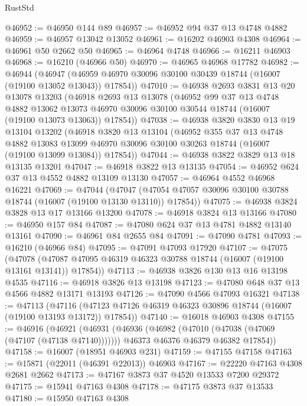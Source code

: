 \begin{lexlean}{RustStd}
\begin{coremodule}
@46952 := @46950 @144 @89
@46957 := @46952 @94 @37 @13 @4748 @4882
@46959 := @46957 @13042 @13052
@46961 := @16202 @46903 @4308
@46964 := @46961 @50 @2662 @50
@46965 := @46964 @4748
@46966 := @16211 @46903
@46968 := @16210 (@46966 @50)
@46970 := @46965 @46968 @17782
@46982 := @46944
    (@46947 (@46959 @46970 @30096 @30100 @30439 @18744 (@16007 (@19100 @13052 @13043)) @17854))
@47010 := @46938
    @2693
    @3831
    @13
    @20
    @13078
    @13203
    (@46918
      @2693
      @13
      @13078
      (@46952
        @99
        @37
        @13
        @4748
        @4882
        @13062
        @13073
        @46970
        @30096
        @30100
        @30544
        @18744
        (@16007 (@19100 @13073 @13063))
        @17854))
@47038 := @46938
    @3820
    @3830
    @13
    @19
    @13104
    @13202
    (@46918
      @3820
      @13
      @13104
      (@46952
        @355
        @37
        @13
        @4748
        @4882
        @13083
        @13099
        @46970
        @30096
        @30100
        @30263
        @18744
        (@16007 (@19100 @13099 @13084))
        @17854))
@47044 := @46938 @3822 @3829 @13 @18 @13135 @13201
@47047 := @46918 @3822 @13 @13135
@47054 := @46952 @624 @37 @13 @4552 @4882 @13109 @13130
@47057 := @46964 @4552 @46968 @16221
@47069 := @47044
    (@47047 (@47054 @47057 @30096 @30100 @30788 @18744 (@16007 (@19100 @13130 @13110)) @17854))
@47075 := @46938 @3824 @3828 @13 @17 @13166 @13200
@47078 := @46918 @3824 @13 @13166
@47080 := @46950 @157 @84
@47087 := @47080 @624 @37 @13 @4781 @4882 @13140 @13161
@47090 := @46961 @84 @2655 @84
@47091 := @47090 @4781
@47093 := @16210 (@46966 @84)
@47095 := @47091 @47093 @17920
@47107 := @47075
    (@47078 (@47087 @47095 @46319 @46323 @30788 @18744 (@16007 (@19100 @13161 @13141)) @17854))
@47113 := @46938 @3826 @130 @13 @16 @13198 @4535
@47116 := @46918 @3826 @13 @13198
@47123 := @47080 @648 @37 @13 @4566 @4882 @13171 @13193
@47126 := @47090 @4566 @47093 @16321
@47138 := @47113
    (@47116 (@47123 @47126 @46319 @46323 @30896 @18744 (@16007 (@19100 @13193 @13172)) @17854))
@47140 := @16018 @46903 @4308
@47155 := @46916
    (@46921
      (@46931
        (@46936 (@46982 (@47010 (@47038 (@47069 (@47107 (@47138 @47140)))))))
        @46373
        @46376
        @46379
        @46382
        @17854))
@47158 := @16007 (@18951 @46903 @231)
@47159 := @47155 @47158
@47163 := @15871 (@22011 (@46391 @22013)) @46903
@47167 := @22220 @47163 @4308 @2681 @2662
@47173 := @47167 @3873 @37 @4520 @13533 @7200 @29372
@47175 := @15941 @47163 @4308
@47178 := @47175 @3873 @37 @13533
@47180 := @15950 @47163 @4308

\end{coremodule}
\end{lexlean}
